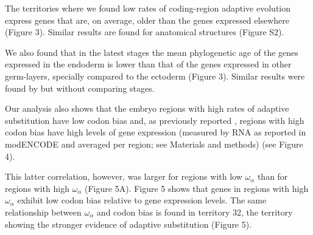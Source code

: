 The territories where we found low rates of coding-region adaptive evolution express genes that are, on average, older than the genes expressed elsewhere (Figure 3). Similar results are found for anatomical structures (Figure S2).

We also found that in the latest stages the mean phylogenetic age of the genes expressed in the endoderm is lower than that of the genes expressed in other germ-layers, specially compared to the ectoderm (Figure 3). Similar results were found by \citep{Domazet-Loso2007} but without comparing stages.

Our analysis also shows that the embryo regions with high rates of adaptive substitution have low codon bias \citep{Sharp1991,Betancourt2002,Haerty2007} and, as previously reported \citep{Plotkin2011}, regions with high codon bias have high levels of gene expression (measured by RNA as reported in modENCODE \citep{Graveley2011} and averaged per region; see Materials and methods) (see Figure 4).

This latter correlation, however, was larger for regions with low $\omega_{\alpha}$ than for regions with high $\omega_{\alpha}$ (Figure 5A). Figure 5 shows that genes in regions with high $\omega_{\alpha}$ exhibit low codon bias relative to gene expression levels. The same relationship between $\omega_{\alpha}$ and codon bias is found in territory 32, the territory showing the stronger evidence of adaptive substitution (Figure 5).
